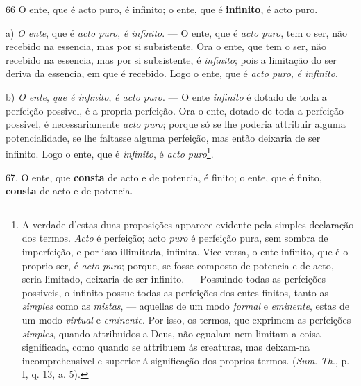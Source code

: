  66 O ente, que é acto puro, é infinito; o ente, que é \textbf{infinito}, é acto puro.

a) \emph{O ente}, que é \emph{acto puro}, \emph{é infinito}. --- O ente, que é \emph{acto puro}, tem o ser, não recebido na essencia, mas por si subsistente. Ora o ente, que tem o ser, não recebido na essencia, mas por si subsistente, é \emph{infinito}; pois a limitação do ser deriva da essencia, em que é recebido. Logo o ente, que é \emph{acto puro}, \emph{é infinito}.

b) \emph{O ente}, \emph{que é infinito}, \emph{é acto puro}. --- O ente \emph{infinito} é dotado de toda a perfeição possivel, é a propria perfeição. Ora o ente, dotado de toda a perfeição possivel, é necessariamente \emph{acto puro}; porque só se lhe poderia attribuir alguma potencialidade, se lhe faltasse alguma perfeição, mas então deixaria de ser infinito. Logo o ente, que é \emph{infinito}, é \emph{acto puro}\footnote{A verdade d'estas duas proposições apparece evidente pela simples declaração dos termos. \emph{Acto} é perfeição; acto \emph{puro} é perfeição pura, sem sombra de imperfeição, e por isso illimitada, infinita. Vice-versa, o ente infinito, que é o proprio ser, é \emph{acto puro}; porque, se fosse composto de potencia e de acto, seria limitado, deixaria de ser infinito. --- Possuindo todas as perfeições possiveis, o infinito possue todas as perfeições dos entes finitos, tanto as \emph{simples} como as \emph{mistas}, --- aquellas de um modo \emph{formal} e \emph{eminente}, estas de um modo \emph{virtual} e \emph{eminente}. Por isso, os termos, que exprimem as perfeições \emph{simples}, quando attribuidos a Deus, não egualam nem limitam a coisa significada, como quando se attribuem ás creaturas, mas deixam-na incomprehensivel e superior á significação dos proprios termos. (\emph{Sum}. \emph{Th}., p. I, q. 13, a. 5).}.

67. O ente, que \textbf{consta} de acto e de potencia, é finito; o ente, que é finito, \textbf{consta} de acto e de potencia.

